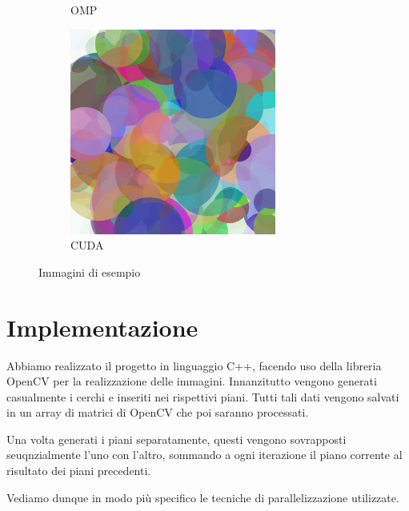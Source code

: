 \documentclass[11pt]{article}
\begin{document}
\begin{figure}[h!]
\begin{subfigure}{0.32\textwidth}
            \caption{OMP}
        \end{subfigure}%
        \hfill
        \begin{subfigure}{0.32\textwidth}
            \centering
            \includegraphics[width=\textwidth]{img/cuda/10000}
            \caption{CUDA}
        \end{subfigure}
        \caption{Immagini di esempio}
        \label{fig:example-images}
    \end{figure}

    \section{Implementazione}
    Abbiamo realizzato il progetto in linguaggio C++, facendo uso della libreria OpenCV per la realizzazione delle immagini.
    Innanzitutto vengono generati casualmente i cerchi e inseriti nei rispettivi piani. Tutti tali dati vengono salvati in un array di matrici di OpenCV che poi saranno processati.
    
    Una volta generati i piani separatamente, questi vengono sovrapposti seuqnzialmente l'uno con l'altro, sommando a ogni iterazione il piano corrente al risultato dei piani precedenti.
    
    Vediamo dunque in modo più specifico le tecniche di parallelizzazione utilizzate.
\end{document}
